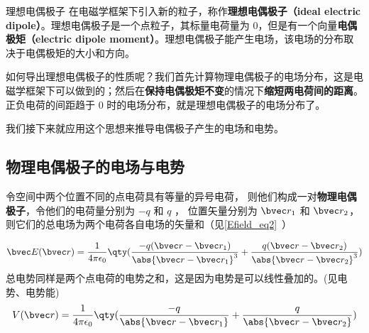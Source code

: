 \begin{definition}{理想电偶极子}
在电磁学框架下引入新的粒子，称作\textbf{理想电偶极子（ideal electric dipole）}。理想电偶极子是一个点粒子，其标量电荷量为 $0$，但是有一个向量\textbf{电偶极矩（electric dipole moment）}。理想电偶极子能产生电场，该电场的分布取决于电偶极矩的大小和方向。
\end{definition}


如何导出理想电偶极子的性质呢？我们首先计算物理电偶极子的电场分布，这是电磁学框架下可以做到的；然后在\textbf{保持电偶极矩不变}的情况下\textbf{缩短两电荷间的距离}。正负电荷的间距趋于 $0$ 时的电场分布，就是理想电偶极子的电场分布了。

我们接下来就应用这个思想来推导电偶极子产生的电场和电势。


\subsection{物理电偶极子的电场与电势}

令空间中两个位置不同的点电荷具有等量的异号电荷， 则他们构成一对\textbf{物理电偶极子}，令他们的电荷量分别为 $-q$ 和 $q$ ， 位置矢量分别为 $\bvec r_1$ 和 $\bvec r_2$， 则它们的总电场为两个电荷各自电场的矢量和（见\autoref{Efield_eq2}~）

\begin{equation}
\bvec E(\bvec r) = \frac{1}{4\pi\epsilon_0} \qty(\frac{-q(\bvec r - \bvec r_1)}{\abs{\bvec r - \bvec r_1}^3} + \frac{q(\bvec r - \bvec r_2)}{\abs{\bvec r - \bvec r_2}^3})
\end{equation}
总电势同样是两个点电荷的电势之和，这是因为电势是可以线性叠加的。(见电势、电势能)
\begin{equation}\label{eleDpl_eq4}
V(\bvec r) = \frac{1}{4\pi\epsilon_0} \qty(\frac{-q}{\abs{\bvec r - \bvec r_1}} + \frac{q}{\abs{\bvec r - \bvec r_2}})
\end{equation}


